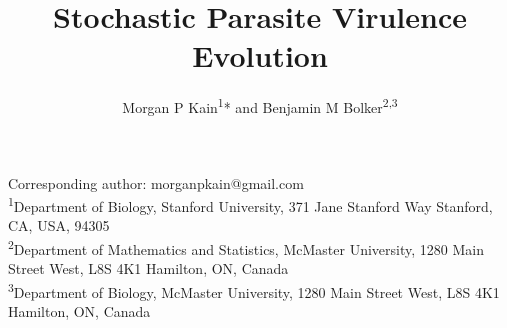 \documentclass{article}
\title{Stochastic Parasite Virulence Evolution}
\author{Morgan P Kain\textsuperscript{1}* and Benjamin M Bolker\textsuperscript{2,3}}
\date{}
\begin{document}
\maketitle

\noindent *Corresponding author: morganpkain@gmail.com \\
\textsuperscript{1}Department of Biology, Stanford University, 371 Jane Stanford Way
Stanford, CA, USA, 94305 \\
\textsuperscript{2}Department of Mathematics and Statistics, McMaster University, 1280 Main Street West, L8S 4K1 Hamilton, ON, Canada \\
\textsuperscript{3}Department of Biology, McMaster University, 1280 Main Street West, L8S 4K1 Hamilton, ON, Canada \\

% 

\clearpage


\end{document}
